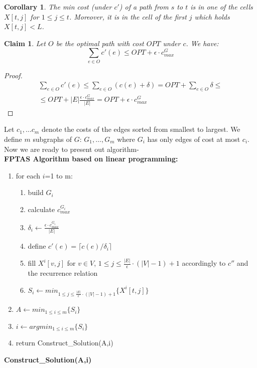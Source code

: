 \documentclass{article}
\newtheorem{corollary}[theorem]{Corollary}
\newtheorem{claim}[section]{Claim}
\begin{document}
\begin{enumerate}
\begin{corollary}\label{corollary}
The min cost (under $c'$) of a path from $s$ to $t$ is in one of the cells $X[t,j]$ for $1\le j \le t$. Moreover, it is in the cell of the first $j$ which holds $X[t,j]<L$.
\end{corollary}
\begin{claim}\label{claim:le}
Let $O$ be the optimal path with cost $OPT$ under $c$. We have:
$$\sum_{e\in O} c'(e) \le OPT +\epsilon\cdot c^G_{max}$$
\end{claim}
\begin{proof}
\begin{align*}
\sum_{e\in O} c'(e) \le \sum_{e\in O} (c(e) + \delta) = OPT + \sum_{e\in O}  \delta \le \\ \le OPT + |E| \frac{\epsilon\cdot c^G_{max}}{|E|} =OPT +\epsilon\cdot c^G_{max}
\end{align*}
\end{proof}
Let $c_1,\ldots c_m$ denote the costs of the edges sorted from smallest to largest. We define $m$ subgraphs of $G$: $G_1,\ldots,G_m$ where $G_i$ has only edges of cost at most $c_i$. Now we are ready to present out algorithm-\\
\textbf{FPTAS Algorithm based on linear programming:}
\begin{enumerate}[I]
	\item for each $i $=1 to m:
	\begin{enumerate}
		\item build $G_i$
		\item calculate $c^{G_i}_{max}$
		\item $\delta_i \leftarrow \frac{\epsilon\cdot c^{G_i}_{max}}{|E|}$
		\item define $c'(e) = \lceil c(e) / \delta_i \rceil$
		\item fill $X^i[v,j]$ for $v\in V$, $1\le j \le \frac{|E|}{\epsilon} \cdot (|V|-1) +1$ accordingly to $c''$ and the recurrence relation
		\item  $S_i \leftarrow min_{1\le j \le \frac{|E|}{\epsilon} \cdot (|V|-1) +1} \{ X^i[t,j]\}$
	\end{enumerate}
	\item $A \leftarrow min_{1\le i \le m} \{ S_i\}$
	\item $i \leftarrow argmin_{1\le i \le m} \{ S_i\}$
	\item return Construct\_Solution(A,i)
\end{enumerate}
\textbf{Construct\_Solution(A,i)}
\begin{enumerate}[I]

\end{enumerate}
\end{enumerate}
\end{document}
